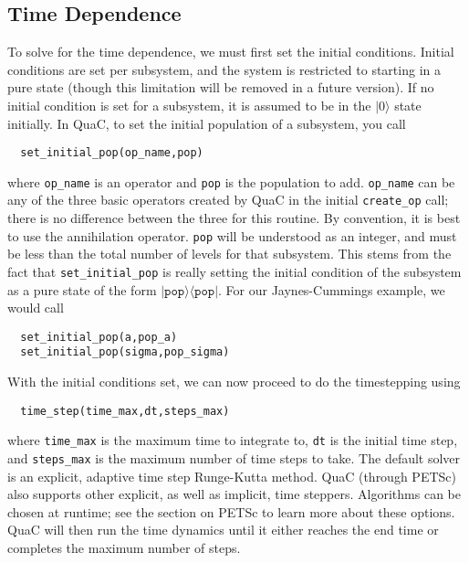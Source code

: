 \documentclass{article}
\begin{document}
\subsection{Time Dependence}
To solve for the time dependence, we must first set the initial conditions. Initial conditions
are set per subsystem, and the system is restricted to starting in a pure state (though
this limitation will be removed in a future version). If no initial condition is set
for a subsystem, it is assumed to be in the $| 0\rangle$ state initially. In QuaC, to set
the initial population of a subsystem, you call
\begin{lstlisting}
  set_initial_pop(op_name,pop)
\end{lstlisting}
where \texttt{op\_name} is an operator and \texttt{pop} is the population to add.
\texttt{op\_name} can be any of the three basic operators created by QuaC in the initial
\texttt{create\_op} call; there is no difference between the three for this routine. By convention,
it is best to use the annihilation operator. \texttt{pop} will be understood as an
integer, and must be less than the total number of levels for that subsystem. This stems
from the fact that \texttt{set\_initial\_pop} is really setting the initial condition of the
subsystem as a pure state of the form $|\texttt{pop}\rangle\langle\texttt{pop}|$. For our
Jaynes-Cummings example, we would call
\begin{lstlisting}
  set_initial_pop(a,pop_a)
  set_initial_pop(sigma,pop_sigma)
\end{lstlisting}
With the initial conditions set, we can now proceed to do the timestepping using
\begin{lstlisting}
  time_step(time_max,dt,steps_max)
\end{lstlisting}
where \texttt{time\_max} is the maximum time to integrate to, \texttt{dt} is the initial
time step, and \texttt{steps\_max} is the maximum number of time steps to take. The default
solver is an explicit, adaptive time step Runge-Kutta method. QuaC (through PETSc) also
supports other explicit, as well as implicit, time steppers. Algorithms can be chosen
at runtime; see the section on PETSc to learn more about these options. QuaC will
then run the time dynamics until it either reaches the end time or completes
the maximum number of steps.
\end{document}
